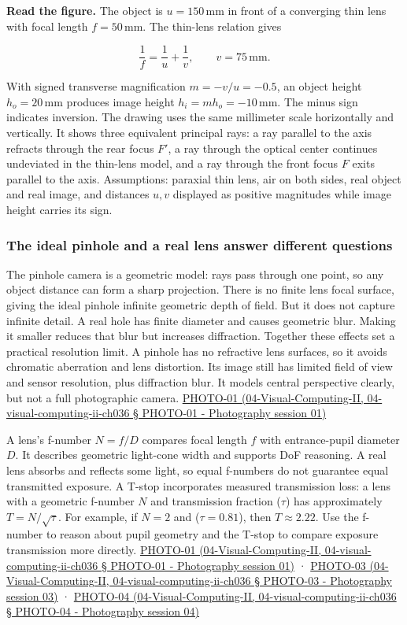 \textbf{Read the figure.} The object is \(u=150\,\mathrm{mm}\) in front of a converging thin lens with focal length \(f=50\,\mathrm{mm}\). The thin-lens relation gives

\[
\frac{1}{f}=\frac{1}{u}+\frac{1}{v},\qquad v=75\,\mathrm{mm}.
\]

With signed transverse magnification \(m=-v/u=-0.5\), an object height \(h_o=20\,\mathrm{mm}\) produces image height \(h_i=mh_o=-10\,\mathrm{mm}\). The minus sign indicates inversion. The drawing uses the same millimeter scale horizontally and vertically. It shows three equivalent principal rays: a ray parallel to the axis refracts through the rear focus \(F'\), a ray through the optical center continues undeviated in the thin-lens model, and a ray through the front focus \(F\) exits parallel to the axis. Assumptions: paraxial thin lens, air on both sides, real object and real image, and distances \(u,v\) displayed as positive magnitudes while image height carries its sign.

\subsubsection{The ideal pinhole and a real lens answer different questions}\label{the-ideal-pinhole-and-a-real-lens-answer-different-questions}

The pinhole camera is a geometric model: rays pass through one point, so any object distance can form a sharp projection. There is no finite lens focal surface, giving the ideal pinhole infinite geometric depth of field. But it does not capture infinite detail. A real hole has finite diameter and causes geometric blur. Making it smaller reduces that blur but increases diffraction. Together these effects set a practical resolution limit. A pinhole has no refractive lens surfaces, so it avoids chromatic aberration and lens distortion. Its image still has limited field of view and sensor resolution, plus diffraction blur. It models central perspective clearly, but not a full photographic camera. \href{}{PHOTO-01 (04-Visual-Computing-II, 04-visual-computing-ii-ch036 § PHOTO-01 - Photography session 01)}

A lens's f-number \(N=f/D\) compares focal length \(f\) with entrance-pupil diameter \(D\). It describes geometric light-cone width and supports DoF reasoning. A real lens absorbs and reflects some light, so equal f-numbers do not guarantee equal transmitted exposure. A T-stop incorporates measured transmission loss: a lens with a geometric f-number \(N\) and transmission fraction (\(\tau\)) has approximately \(T=N/\sqrt{\tau}\). For example, if \(N=2\) and (\(\tau=0.81\)), then \(T\approx2.22\). Use the f-number to reason about pupil geometry and the T-stop to compare exposure transmission more directly. \href{}{PHOTO-01 (04-Visual-Computing-II, 04-visual-computing-ii-ch036 § PHOTO-01 - Photography session 01)} · \href{}{PHOTO-03 (04-Visual-Computing-II, 04-visual-computing-ii-ch036 § PHOTO-03 - Photography session 03)} · \href{}{PHOTO-04 (04-Visual-Computing-II, 04-visual-computing-ii-ch036 § PHOTO-04 - Photography session 04)}


